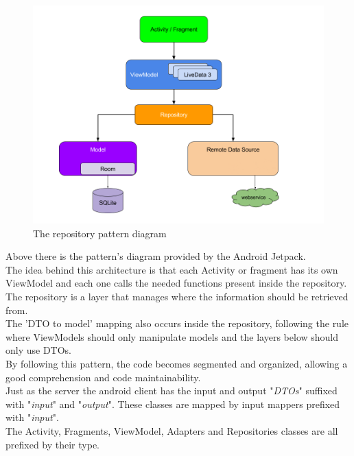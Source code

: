 \begin{figure}[H]
    \begin{center}
        \includegraphics[scale=0.5]{_figures/repository_pattern2.png}
        \caption{The repository pattern diagram}
    \end{center}
\end{figure}

Above there is the pattern's diagram provided by the Android Jetpack.\\

The idea behind this architecture is that each Activity or fragment has its own ViewModel and each one calls the needed functions present inside the repository.
The repository is a layer that manages where the information should be retrieved from.\\

The 'DTO to model' mapping also occurs inside the repository, following the rule where ViewModels should only manipulate models and the layers below should only use DTOs.\\

By following this pattern, the code becomes segmented and organized, allowing a good comprehension and code maintainability.\\

Just as the server the android client has the input and output "\textit{DTOs}" suffixed with "\textit{input}" and "\textit{output}". 
These classes are mapped by input mappers prefixed with "\textit{input}".\\

The Activity, Fragments, ViewModel, Adapters and Repositories classes are all prefixed by their type.

